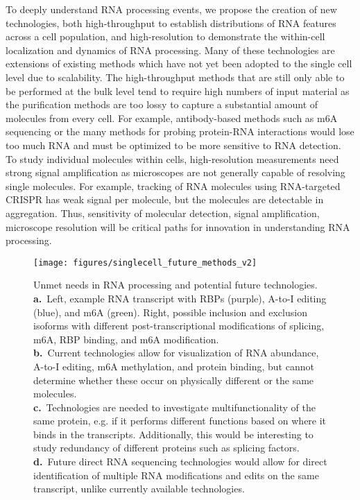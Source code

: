 To deeply understand RNA processing events, we propose the creation of new technologies, both high-throughput to establish distributions of RNA features across a cell population, and high-resolution to demonstrate the within-cell localization and dynamics of RNA processing. Many of these technologies are extensions of existing methods which have not yet been adopted to the single cell level due to scalability. The high-throughput methods that are still only able to be performed at the bulk level tend to require high numbers of input material as the purification methods are too lossy to capture a substantial amount of molecules from every cell. For example, antibody-based methods such as m6A sequencing \cite{Dominissini2012-rc,Dominissini2013-gk,Linder2015-pg} or the many methods for probing protein-RNA interactions \cite{Haberman2017-at,Huppertz2014-jt,Van_Nostrand2016-qd,Zarnegar2016-zq} would lose too much RNA and must be optimized to be more sensitive to RNA detection. To study individual molecules within cells, high-resolution measurements need strong signal amplification as microscopes are not generally capable of resolving single molecules.  For example, tracking of RNA molecules using RNA-targeted CRISPR \cite{Nelles2016-my} has weak signal per molecule, but the molecules are detectable in aggregation. Thus, sensitivity of molecular detection, signal amplification, microscope resolution will be critical paths for innovation in understanding RNA processing.


\begin{figure}
  \centering
  \texttt{[image: figures/singlecell\_future\_methods\_v2]}
  \caption[Unmet needs in RNA processing and potential future technologies.]{Unmet needs in RNA processing and potential future technologies.\\
\textbf{a.}~Left, example RNA transcript with RBPs (purple), A-to-I editing (blue), and m6A (green). Right,  possible inclusion and exclusion isoforms with different post-transcriptional modifications of splicing, m6A, RBP binding, and m6A modification.\\
\textbf{b.}~Current technologies allow for visualization of RNA abundance, A-to-I editing, m6A methylation, and protein binding, but cannot determine whether these occur on physically different or the same molecules.\\
\textbf{c.}~Technologies are needed to investigate multifunctionality of the same protein, e.g. if it performs different functions based on where it binds in the transcripts. Additionally, this would be interesting to study redundancy of different proteins such as splicing factors.\\
\textbf{d.}~Future direct RNA sequencing technologies would allow for direct identification of multiple RNA modifications and edits on the same transcript, unlike currently available technologies.}
\label{fig:singlecell_future_methods}
\end{figure}

